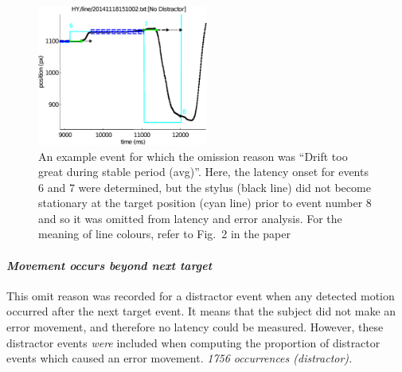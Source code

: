 \documentclass[11pt, a4paper]{article}
\begin{document}
\begin{figure}[htb!]
\centering
\includegraphics[width=0.5\textwidth]{./figures/drift_too_great_nolegend.eps}
\caption[Drift too great] {An example event for which the omission
  reason was ``Drift too great during stable period (avg)''. Here, the
  latency onset for events 6 and 7 were determined, but the stylus
  (black line) did not become stationary at the target position (cyan
  line) prior to event number 8 and so it was omitted from latency and
  error analysis. For the meaning of line colours, refer to
  Fig.~2 in the paper}
\label{omission_reason_8}
\end{figure}




\paragraph{\emph{Movement occurs beyond next target}}
This omit reason was recorded for a distractor event when any detected
motion occurred after the next target event. It means that the subject
did not make an error movement, and therefore no latency could be
measured. However, these distractor events \emph{were} included when
computing the proportion of distractor events which caused an error
movement. \emph{1756 occurrences (distractor).}
\end{document}

